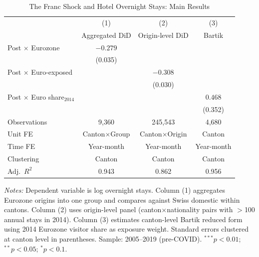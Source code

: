 \begin{table}[t]
\begin{threeparttable}
\centering
\caption{The Franc Shock and Hotel Overnight Stays: Main Results}
\label{tab:main}
\begin{tabular}{lccc}
\toprule
 & (1) & (2) & (3) \\
 & Aggregated DiD & Origin-level DiD & Bartik \\
\midrule
Post $\times$ Eurozone & $-0.279$ & & \\
 & (0.035) & & \\
Post $\times$ Euro-exposed & & $-0.308$ & \\
 & & (0.030) & \\
Post $\times$ Euro share$_{2014}$ & & & $0.468$ \\
 & & & (0.352) \\[6pt]
\midrule
Observations & 9,360 & 245,543 & 4,680 \\
Unit FE & Canton$\times$Group & Canton$\times$Origin & Canton \\
Time FE & Year-month & Year-month & Year-month \\
Clustering & Canton & Canton & Canton \\
Adj.\ $R^2$ & 0.943 & 0.862 & 0.956 \\
\bottomrule
\end{tabular}
\begin{tablenotes}
\item \textit{Notes:} Dependent variable is log overnight stays. Column (1) aggregates Eurozone origins into one group and compares against Swiss domestic within cantons. Column (2) uses origin-level panel (canton$\times$nationality pairs with $>$100 annual stays in 2014). Column (3) estimates canton-level Bartik reduced form using 2014 Eurozone visitor share as exposure weight. Standard errors clustered at canton level in parentheses. Sample: 2005--2019 (pre-COVID). $^{***}p<0.01$; $^{**}p<0.05$; $^{*}p<0.1$.
\end{tablenotes}
\end{threeparttable}
\end{table}
